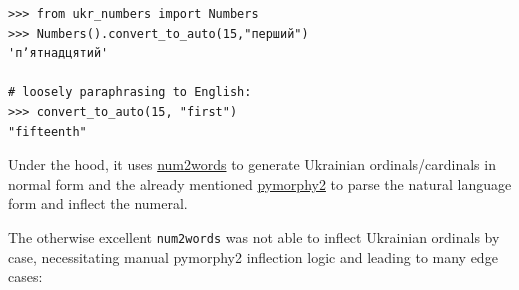 \begin{verbatim}
>>> from ukr_numbers import Numbers
>>> Numbers().convert_to_auto(15,"перший")
'пʼятнадцятий'

# loosely paraphrasing to English: 
>>> convert_to_auto(15, "first")
"fifteenth"
\end{verbatim}

Under the hood, it uses
\href{https://pypi.org/project/num2words/}{num2words} to generate
Ukrainian ordinals/cardinals in normal form and the already mentioned
\href{https://github.com/pymorphy2/}{pymorphy2} to parse the natural
language form and inflect the numeral.

The otherwise excellent \texttt{num2words} was not able to inflect
Ukrainian ordinals by case, necessitating manual pymorphy2 inflection
logic and leading to many edge cases:

